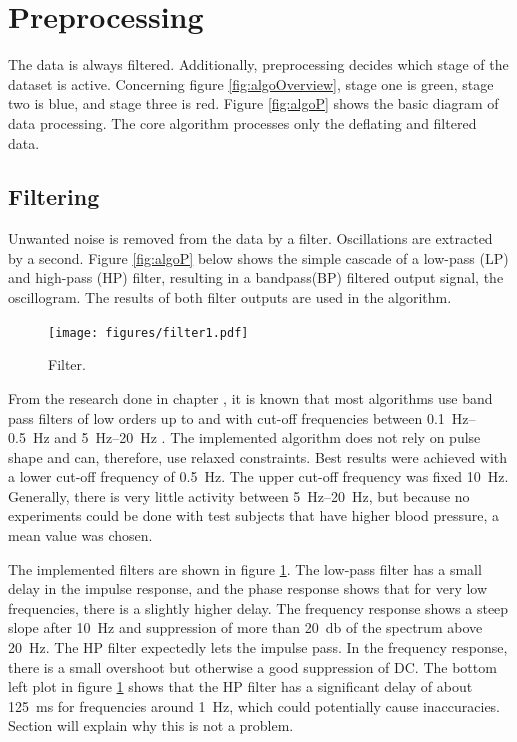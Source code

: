 \section{Preprocessing}
The data is always filtered. Additionally, preprocessing decides which stage of the dataset is active. Concerning figure \ref{fig:algoOverview}, stage one is green, stage two is blue, and stage three is red. Figure \ref{fig:algoP} shows the basic diagram of data processing.  The core algorithm processes only the deflating and filtered data.  

\subsection{Filtering}\label{sec:filt}
Unwanted noise is removed from the data by a filter. Oscillations are extracted by a second. Figure \ref{fig:algoP} below shows the simple cascade of a low-pass (LP) and high-pass (HP) filter, resulting in a bandpass(BP) filtered output signal, the oscillogram. The results of both filter outputs are used in the algorithm.


\begin{figure}[ht]
\centering
\texttt{[image: figures/filter1.pdf]}
\caption{Filter.}
\label{fig:filters}
\end{figure}

From the research done in chapter , it is known that most algorithms use band pass filters of low orders up to  and with cut-off frequencies between \SIrange{0.1}{0.5}{\Hz} and \SIrange{5}{20}{\Hz} \citep{Forouzanfar2015}. The implemented algorithm does not rely on pulse shape and can, therefore, use relaxed constraints. Best results were achieved with a lower cut-off frequency of \SI{0.5}{\Hz}. The upper cut-off frequency was fixed \SI{10}{\Hz}. Generally, there is very little activity between \SIrange{5}{20}{\Hz}, but because no experiments could be done with test subjects that have higher blood pressure, a mean value was chosen. 

The implemented filters are shown in figure \ref{fig:filters}. The low-pass filter has a small delay in the impulse response, and the phase response shows that for very low frequencies, there is a slightly higher delay. The frequency response shows a steep slope after \SI{10}{\Hz} and suppression of more than \SI{20}{\decibel} of the spectrum above \SI{20}{\Hz}. The HP filter expectedly lets the impulse pass. In the frequency response, there is a small overshoot but otherwise a good suppression of DC. The bottom left plot in figure \ref{fig:filters} shows that the HP filter has a significant delay of about \SI{125}{\milli\second} for frequencies around \SI{1}{\Hz}, which could potentially cause inaccuracies. Section  will explain why this is not a problem.


